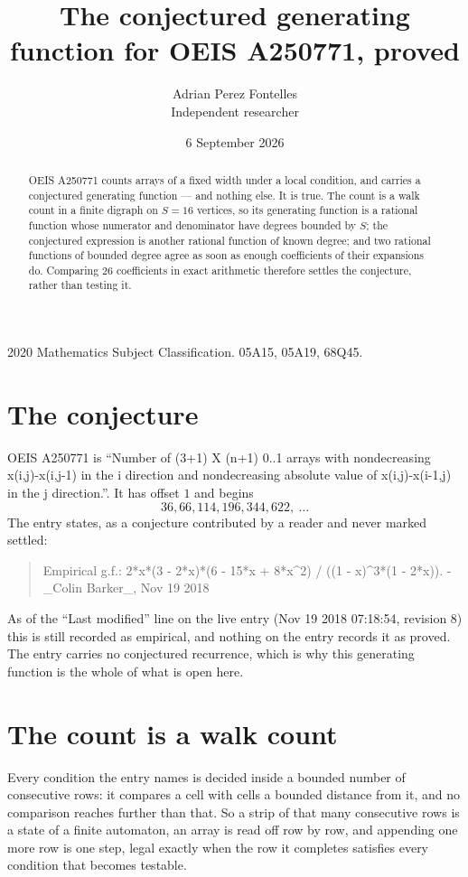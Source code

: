 \documentclass[11pt,a4paper]{article}
\title{The conjectured generating function for OEIS A250771, proved}
\author{Adrian Perez Fontelles\\ \small Independent researcher}
\date{6 September 2026}
\theoremstyle{plain}
\theoremstyle{definition}
\begin{document}
\maketitle

\begin{abstract}
OEIS A250771 counts arrays of a fixed width under a local condition, and carries a conjectured
generating function --- and nothing else. It is true. The count is a walk count in a finite
digraph on $S=16$ vertices, so its generating function is a rational function whose numerator
and denominator have degrees bounded by $S$; the conjectured expression is another rational
function of known degree; and two rational functions of bounded degree agree as soon as enough
coefficients of their expansions do. Comparing $26$ coefficients in exact arithmetic
therefore settles the conjecture, rather than testing it.
\end{abstract}

\noindent\small 2020 Mathematics Subject Classification. 05A15, 05A19, 68Q45.\normalsize

\section{The conjecture}

OEIS A250771 is ``Number of (3+1) X (n+1) 0..1 arrays with nondecreasing x(i,j)-x(i,j-1) in the i direction and nondecreasing absolute value of x(i,j)-x(i-1,j) in the j direction.''. It has offset $1$ and begins
\[
36, 66, 114, 196, 344, 622,\ \dots
\]
The entry states, as a conjecture contributed by a reader and never marked settled:
\begin{quote}
Empirical g.f.: 2*x*(3 - 2*x)*(6 - 15*x + 8*x\^{}2) / ((1 - x)\^{}3*(1 - 2*x)). - \_Colin Barker\_, Nov 19 2018
\end{quote}
As of the ``Last modified'' line on the live entry (Nov 19 2018 07:18:54, revision 8) this is still
recorded as empirical, and nothing on the entry records it as proved. The entry carries no
conjectured recurrence, which is why this generating function is the whole of what is open
here.

\section{The count is a walk count}

Every condition the entry names is decided inside a bounded number of consecutive rows: it
compares a cell with cells a bounded distance from it, and no comparison reaches further than
that. So a strip of that many consecutive rows is a state of a finite automaton, an array is
read off row by row, and appending one more row is one step, legal exactly when the row it
completes satisfies every condition that becomes testable.
\end{document}
